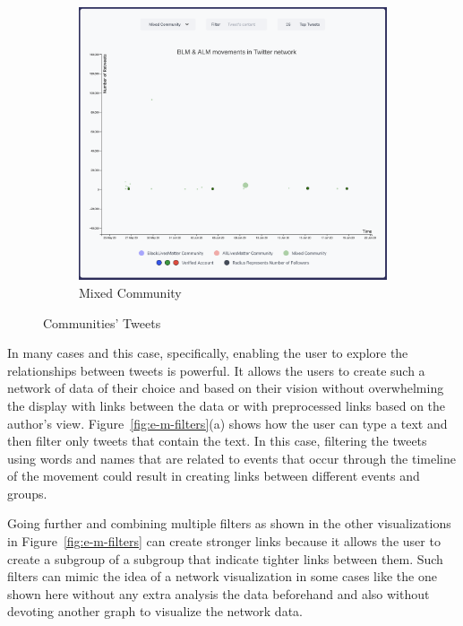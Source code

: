 \begin{figure}[H]
\begin{subfigure}{.45\textwidth}
  \label{fig:sub-second-almc}
\end{subfigure}
\begin{subfigure}{.45\textwidth}
  \centering
  \captionsetup{justification=centering}
  \includegraphics[width=0.9\linewidth]{./pics/emixed.png}  
  \caption{Mixed Community}
  \label{fig:sub-third-mc}
\end{subfigure}

\captionsetup{justification=centering}
\caption{Communities' Tweets }
\label{fig:e-coms}
\end{figure}

\newpage


In many cases and this case, specifically, enabling the user to explore the relationships between tweets is powerful. It allows the users to create such a network of data of their choice and based on their vision without overwhelming the display with links between the data or with preprocessed links based on the author's view. 
Figure~\ref{fig:e-m-filters}(a) shows how the user can type a text and then filter only tweets that contain the text. In this case, filtering the tweets using words and names that are related to events that occur through the timeline of the movement could result in creating links between different events and groups. 

Going further and combining multiple filters as shown in the other visualizations in Figure~\ref{fig:e-m-filters} can create stronger links because it allows the user to create a subgroup of a subgroup that indicate tighter links between them. Such filters can mimic the idea of a network visualization in some cases like the one shown here without any extra analysis the data beforehand and also without devoting another graph to visualize the network data.    


